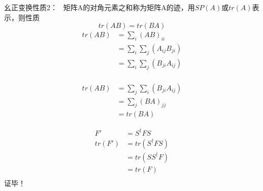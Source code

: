 \begin{frame} {幺正变换性质2：}
    \例[6.试证明幺正变换不改变矩阵的迹]{}
    \证 ~矩阵A的对角元素之和称为矩阵A的迹，用$SP(A)$或$tr(A)$表示，则性质\\
    $$tr(AB)=tr(BA) $$
    \begin{equation*}
        \begin{split}
            tr(AB) &=\sum_i (AB)_{ii}\\
            &=\sum_{i} \sum_{j} (A_{ij} B_{ji}) \\
            &=\sum_{i} \sum_{j} (B_{ji} A_{ij}) \\
        \end{split} 
    \end{equation*} 
\end{frame}    


\begin{frame}     
    \begin{equation*}
        \begin{split}
            tr(AB) &=\sum_{j} \sum_{i} (B_{ji} A_{ij}) \\
            &=\sum_{j} (BA)_{jj} \\
            &=tr(BA)
        \end{split} 
    \end{equation*}

    \begin{equation*}
        \begin{split}
            F'&= S^{\dagger} F S \\
            tr(F')&=tr(S^{\dagger} F S)\\
            &=tr(SS^{\dagger}  F)\\
            &=tr(F)\\
        \end{split} 
    \end{equation*} 
    证毕！
\end{frame}    

